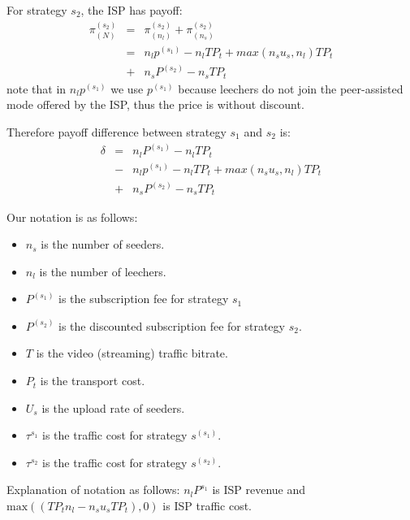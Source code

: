 \documentclass[paper]{ieice}
\begin{document}
For strategy $s_2$, the ISP has payoff:
\begin{eqnarray}
	\pi^{(s_2)}_{(N)} &=& \pi^{(s_2)}_{(n_l)} + \pi^{(s_2)}_{(n_s)}\\
	\nonumber &=&n_l p^{(s_1)} - n_lTP_t + max (n_s u_s,n_l)T P_t\\
	&+&n_s P^{(s_2)} - n_s T P_t
\end{eqnarray}
note that in $n_l p^{(s_1)}$ we use $p^{(s_1)}$ because leechers do
not join the peer-assisted mode offered by the ISP, thus the price is without discount.

Therefore payoff difference between strategy $s_1$ and $s_2$ is:
\begin{eqnarray}
	\delta &=& n_l P^{(s_1)} - n_l T P_t \\
	&-& n_l p^{(s_1)} - n_lTP_t + max (n_s u_s,n_l)T P_t \\
	&+& n_s P^{(s_2)} - n_s T P_t
\end{eqnarray}

Our notation is as follows:
\begin{itemize}
	\item $n_s$ is the number of seeders.
	\item $n_l$ is the number of leechers.
	\item $P^{(s_1)}$ is the subscription fee for strategy $s_1$
	\item $P^{(s_2)}$ is the discounted subscription fee for strategy $s_2$.
	\item $T$ is the video (streaming) traffic bitrate. 
	\item $P_t$ is the transport cost. 
	\item $U_s$ is the upload rate of seeders.
	\item $\tau^{s_1}$ is the traffic cost for strategy $s^{(s_1)}$.
	\item $\tau^{s_2}$ is the traffic cost for strategy $s^{(s_2)}$.
\end{itemize}
Explanation of notation as follows:
$n_lP^{s_1}$ is ISP revenue and $\text{max}((TP_tn_l - n_su_sTP_t),0)$ is ISP traffic cost.
\end{document}
